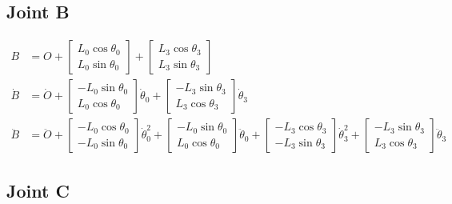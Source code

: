 \documentclass[letterpaper]{article}
\begin{document}
\subsection{Joint B}

\begin{align}
	B &= O + \begin{bmatrix} L_0 \cos \theta_0 \\ L_0 \sin \theta_0 \end{bmatrix} + \begin{bmatrix} L_3 \cos \theta_3 \\ L_3 \sin \theta_3 \end{bmatrix} \\
	\dot{B} &= \dot{O} + \begin{bmatrix} -L_0 \sin \theta_0 \\ L_0 \cos \theta_0 \end{bmatrix} \dot{\theta}_0 + \begin{bmatrix} -L_3 \sin \theta_3 \\ L_3 \cos \theta_3 \end{bmatrix} \dot{\theta}_3 \\
	\ddot{B} &= \ddot{O} +  \begin{bmatrix} -L_0 \cos \theta_0 \\ - L_0 \sin \theta_0 \end{bmatrix} \dot{\theta}_0^2 + \begin{bmatrix} -L_0 \sin \theta_0 \\ L_0 \cos \theta_0 \end{bmatrix} \ddot{\theta}_0 + \begin{bmatrix} -L_3 \cos \theta_3 \\ - L_3 \sin \theta_3 \end{bmatrix} \dot{\theta}_3^2 + \begin{bmatrix} -L_3 \sin \theta_3 \\ L_3 \cos \theta_3 \end{bmatrix} \ddot{\theta}_3 
\end{align}

\subsection{Joint C}
 
\end{document}
